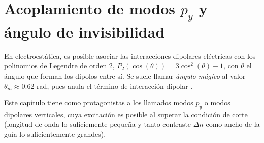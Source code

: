\chapter{Acoplamiento de modos $p_y$ y ángulo de invisibilidad}
En electroestática, es posible asociar las interacciones dipolares eléctricas con los polinomios de Legendre de orden 2, $P_2(\cos(\theta))=3\cos^2(\theta)-1$, con $\theta$ el ángulo que forman los dipolos entre sí. Se suele llamar \textit{ángulo mágico} al valor $\theta_m \approx 0.62$ rad, pues anula el término de interacción dipolar \citep{medmagic}. 

Este capítulo tiene como protagonistas a los llamados modos $p_y$ o modos dipolares verticales, cuya excitación es posible al superar la condición de corte (longitud de onda lo suficiemente pequeña y tanto contraste $\Delta n$ como ancho de la guía lo suficientemente grandes).



